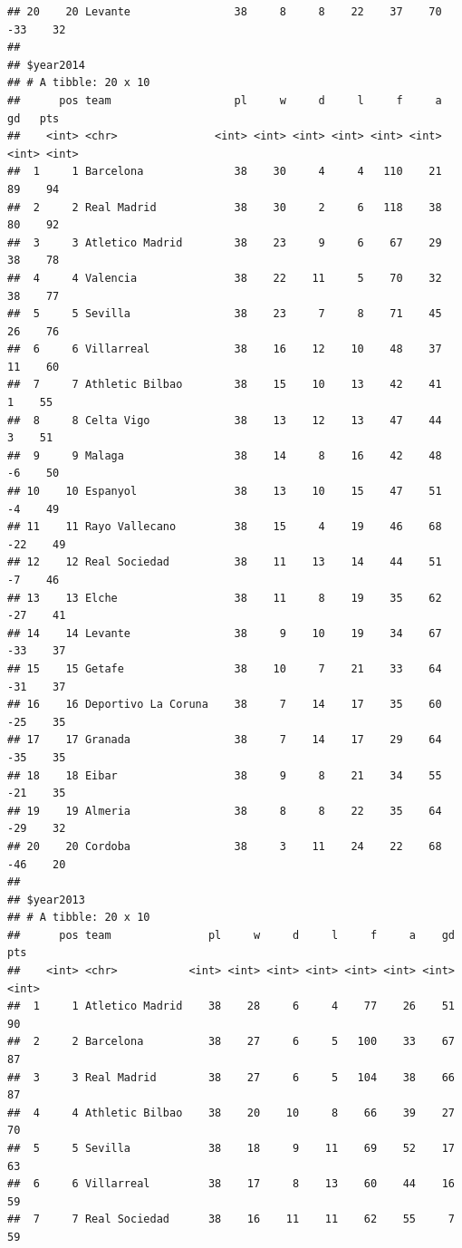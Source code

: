 \documentclass[]{tufte-handout}
\begin{document}
\begin{verbatim}
## 20    20 Levante                38     8     8    22    37    70   -33    32
## 
## $year2014
## # A tibble: 20 x 10
##      pos team                   pl     w     d     l     f     a    gd   pts
##    <int> <chr>               <int> <int> <int> <int> <int> <int> <int> <int>
##  1     1 Barcelona              38    30     4     4   110    21    89    94
##  2     2 Real Madrid            38    30     2     6   118    38    80    92
##  3     3 Atletico Madrid        38    23     9     6    67    29    38    78
##  4     4 Valencia               38    22    11     5    70    32    38    77
##  5     5 Sevilla                38    23     7     8    71    45    26    76
##  6     6 Villarreal             38    16    12    10    48    37    11    60
##  7     7 Athletic Bilbao        38    15    10    13    42    41     1    55
##  8     8 Celta Vigo             38    13    12    13    47    44     3    51
##  9     9 Malaga                 38    14     8    16    42    48    -6    50
## 10    10 Espanyol               38    13    10    15    47    51    -4    49
## 11    11 Rayo Vallecano         38    15     4    19    46    68   -22    49
## 12    12 Real Sociedad          38    11    13    14    44    51    -7    46
## 13    13 Elche                  38    11     8    19    35    62   -27    41
## 14    14 Levante                38     9    10    19    34    67   -33    37
## 15    15 Getafe                 38    10     7    21    33    64   -31    37
## 16    16 Deportivo La Coruna    38     7    14    17    35    60   -25    35
## 17    17 Granada                38     7    14    17    29    64   -35    35
## 18    18 Eibar                  38     9     8    21    34    55   -21    35
## 19    19 Almeria                38     8     8    22    35    64   -29    32
## 20    20 Cordoba                38     3    11    24    22    68   -46    20
## 
## $year2013
## # A tibble: 20 x 10
##      pos team               pl     w     d     l     f     a    gd   pts
##    <int> <chr>           <int> <int> <int> <int> <int> <int> <int> <int>
##  1     1 Atletico Madrid    38    28     6     4    77    26    51    90
##  2     2 Barcelona          38    27     6     5   100    33    67    87
##  3     3 Real Madrid        38    27     6     5   104    38    66    87
##  4     4 Athletic Bilbao    38    20    10     8    66    39    27    70
##  5     5 Sevilla            38    18     9    11    69    52    17    63
##  6     6 Villarreal         38    17     8    13    60    44    16    59
##  7     7 Real Sociedad      38    16    11    11    62    55     7    59

\end{verbatim}
\end{document}
